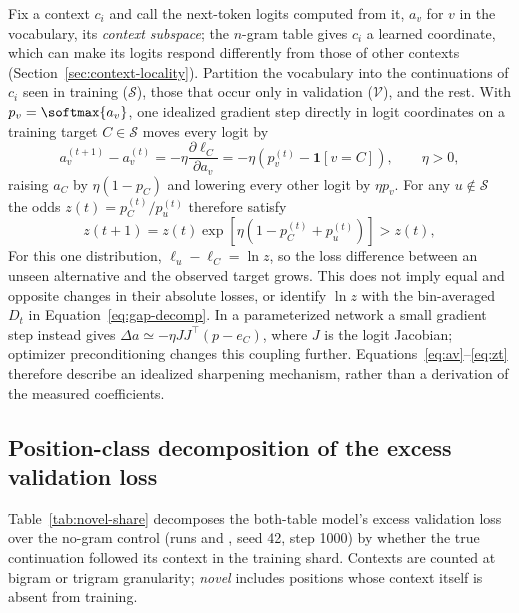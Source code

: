 Fix a context $c_i$ and call the next-token logits computed from it, $a_v$ for $v$ in the vocabulary, its \emph{context subspace}; the $n$-gram table gives $c_i$ a learned coordinate, which can make its logits respond differently from those of other contexts (Section~\ref{sec:context-locality}). Partition the vocabulary into the continuations of $c_i$ seen in training ($\mathcal{S}$), those that occur only in validation ($\mathcal{V}$), and the rest. With $p_v=\softmax{a_v}$, one idealized gradient step directly in logit coordinates on a training target $C\in\mathcal{S}$ moves every logit by
\begin{equation}
a_v^{(t+1)}-a_v^{(t)}=-\eta\frac{\partial\ell_C}{\partial a_v}=-\eta\left(p_v^{(t)}-\mathbf{1}[v=C]\right),\qquad \eta>0,
\label{eq:av}
\end{equation}
raising $a_C$ by $\eta(1-p_C)$ and lowering every other logit by $\eta p_v$. For any $u\notin\mathcal{S}$ the odds $z(t)=p_C^{(t)}/p_u^{(t)}$ therefore satisfy
\begin{equation}
z(t+1)=z(t)\exp\!\left[\eta\left(1-p_C^{(t)}+p_u^{(t)}\right)\right]>z(t),
\label{eq:zt}
\end{equation}
For this one distribution, $\ell_u-\ell_C=\ln z$, so the loss difference between an unseen alternative and the observed target grows. This does not imply equal and opposite changes in their absolute losses, or identify $\ln z$ with the bin-averaged $D_t$ in Equation~\eqref{eq:gap-decomp}. In a parameterized network a small gradient step instead gives $\Delta a\simeq-\eta JJ^\top(p-e_C)$, where $J$ is the logit Jacobian; optimizer preconditioning changes this coupling further. Equations~\eqref{eq:av}--\eqref{eq:zt} therefore describe an idealized sharpening mechanism, rather than a derivation of the measured coefficients.

\subsection{Position-class decomposition of the excess validation loss}
\label{app:novel-share}

Table~\ref{tab:novel-share} decomposes the both-table model's excess validation loss over the no-gram control (runs  and , seed 42, step 1000) by whether the true continuation followed its context in the training shard. Contexts are counted at bigram or trigram granularity; \emph{novel} includes positions whose context itself is absent from training.

